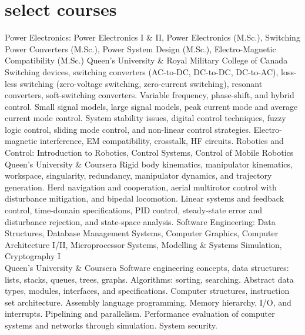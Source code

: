 
\section{select courses}

\begin{entrylist}
\entry
  {}
  {Power Electronics: Power Electronics I \& II, Power Electronics (M.Sc.), Switching Power Converters (M.Sc.), Power System Design (M.Sc.), Electro-Magnetic Compatibility (M.Sc.)}
  {Queen's University \& Royal Military College of Canada}
  {Switching devices, switching converters (AC-to-DC, DC-to-DC, DC-to-AC), 
  loss-less switching (zero-voltage switching, zero-current switching), resonant converters, soft-switching converters. 
  Variable frequency, phase-shift, and hybrid control. Small signal 
  models, large signal models, peak current mode and average current mode control. System stability issues, 
  digital control techniques, fuzzy logic control, sliding mode control, and non-linear control strategies. 
  Electro-magnetic interference, EM compatibility, crosstalk, HF circuits.}
\entry
  {}
  {Robotics and Control: Introduction to Robotics, Control Systems, Control of Mobile Robotics}
  {\\Queen's University \& Coursera}
  {Rigid body kinematics, manipulator kinematics, workspace, singularity, redundancy, 
  manipulator dynamics, and trajectory generation. Herd navigation and cooperation, aerial multirotor control with disturbance
  mitigation, and bipedal locomotion. Linear systems and feedback control, time-domain specifications, 
  PID control, steady-state error and disturbance rejection, and state-space analysis.}
\entry
  {}
  {Software Engineering: Data Structures, Database Management Systems, Computer Graphics, Computer Architecture I/II, Microprocessor Systems, Modelling \& Systems Simulation, Cryptography I}
  {\\Queen's University \& Coursera}
  {Software engineering concepts, data structures: lists, stacks, queues, trees, graphs. Algorithms: sorting, searching. Abstract data types, modules, interfaces, and specifications.
  Computer structures, instruction set architecture. Assembly language programming. Memory hierarchy, I/O, and interrupts. Pipelining and parallelism.
  Performance evaluation of computer systems and networks through simulation. System security.}
\end{entrylist}